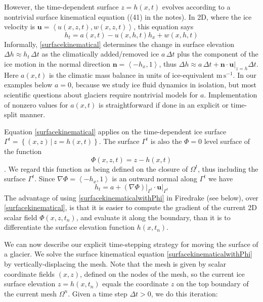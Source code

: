 \documentclass[letterpaper,final,12pt,reqno]{amsart}
\newcommand{\grad}{\nabla}
\newcommand{\bn}{\mathbf{n}}
\newcommand{\bu}{\mathbf{u}}
\begin{document}
However, the time-dependent surface $z=h(x,t)$ evolves according to a nontrivial surface kinematical equation ((41) in the notes).  In 2D, where the ice velocity is $\bu=\left<u(x,z,t),w(x,z,t)\right>$, this equation says
\begin{equation}
h_t = a(x,t) - u(x,h,t) h_x + w(x,h,t) \label{surfacekinematical}
\end{equation}
Informally, \eqref{surfacekinematical} determines the change in surface elevation $\Delta h \approx h_t\,\Delta t$ as the climatically added/removed ice $a\,\Delta t$ plus the component of the ice motion in the normal direction $\bn = \left<-h_x,1\right>$, thus $\Delta h \approx a \,\Delta t + \bn\cdot \bu\big|_{z=h} \Delta t$.  Here $a(x,t)$ is the climatic mass balance in units of ice-equivalent $\text{m}\,\text{s}^{-1}$.  In our examples below $a=0$, because we study ice fluid dynamics in isolation, but most scientific questions about glaciers require nontrivial models for $a$.  Implementation of nonzero values for $a(x,t)$ is straightforward if done in an explicit or time-split manner.

Equation \eqref{surfacekinematical} applies on the time-dependent ice surface $\Gamma^t = \left\{(x,z) \,\big|\, z = h(x,t)\right\}$.  The surface $\Gamma^t$ is also the $\Phi=0$ level surface of the function
    $$\Phi(x,z,t) = z - h(x,t)$$
\cite[pp.~65--66]{GreveBlatter2009}.  We regard this function as being defined on the closure of $\Omega^t$, thus including the surface $\Gamma^t$.  Since $\grad \Phi = \left<-h_x,1\right>$ is an outward normal along $\Gamma^t$ we have
\begin{equation}
h_t = a + (\grad \Phi)\big|_{\Gamma^t} \cdot \bu\big|_{\Gamma^t}  \label{surfacekinematicalwithPhi}
\end{equation}
The advantage of using \eqref{surfacekinematicalwithPhi} in Firedrake (see below), over \eqref{surfacekinematical}, is that it is easier to compute the gradient of the current 2D scalar field $\Phi(x,z,t_n)$, and evaluate it along the boundary, than it is to differentiate the surface elevation function $h(x,t_n)$.

We can now describe our explicit time-stepping strategy for moving the surface of a glacier.  We solve the surface kinematical equation \eqref{surfacekinematicalwithPhi} by vertically-displacing the mesh.  Note that the mesh is given by scalar coordinate fields $(x,z)$, defined on the nodes of the mesh, so the current ice surface elevation $z=h(x,t_n)$ equals the coordinate $z$ on the top boundary of the current mesh $\Omega^n$.  Given a time step $\Delta t > 0$, we do this iteration:
\end{document}
